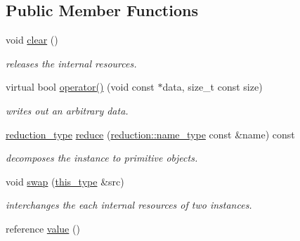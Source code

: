 \subsection*{Public Member Functions}
\begin{DoxyCompactItemize}
\item 
\hypertarget{classhryky_1_1_adapter_adbdbd187b837f6782b776ca8aabd411b}{void \hyperlink{classhryky_1_1_adapter_adbdbd187b837f6782b776ca8aabd411b}{clear} ()}\label{classhryky_1_1_adapter_adbdbd187b837f6782b776ca8aabd411b}

\begin{DoxyCompactList}\small\item\em releases the internal resources. \end{DoxyCompactList}\item 
\hypertarget{classhryky_1_1writer_1_1_adapter_a6078dbc44e91c1ec4f4e6ddc62aac4be}{virtual bool \hyperlink{classhryky_1_1writer_1_1_adapter_a6078dbc44e91c1ec4f4e6ddc62aac4be}{operator()} (void const $\ast$data, size\-\_\-t const size)}\label{classhryky_1_1writer_1_1_adapter_a6078dbc44e91c1ec4f4e6ddc62aac4be}

\begin{DoxyCompactList}\small\item\em writes out an arbitrary data. \end{DoxyCompactList}\item 
\hypertarget{classhryky_1_1_adapter_a42532b43ac680d162bbc1a2e3ebc6b99}{\hyperlink{namespacehryky_a343a9a4c36a586be5c2693156200eadc}{reduction\-\_\-type} \hyperlink{classhryky_1_1_adapter_a42532b43ac680d162bbc1a2e3ebc6b99}{reduce} (\hyperlink{namespacehryky_1_1reduction_ac686c30a4c8d196bbd0f05629a6b921f}{reduction\-::name\-\_\-type} const \&name) const}\label{classhryky_1_1_adapter_a42532b43ac680d162bbc1a2e3ebc6b99}

\begin{DoxyCompactList}\small\item\em decomposes the instance to primitive objects. \end{DoxyCompactList}\item 
\hypertarget{classhryky_1_1_adapter_ae95517793bc16f6ba623bc994bc17c43}{void \hyperlink{classhryky_1_1_adapter_ae95517793bc16f6ba623bc994bc17c43}{swap} (\hyperlink{classhryky_1_1writer_1_1_adapter_a9fe895f62ad5d6fa98ea5264772b6a26}{this\-\_\-type} \&src)}\label{classhryky_1_1_adapter_ae95517793bc16f6ba623bc994bc17c43}

\begin{DoxyCompactList}\small\item\em interchanges the each internal resources of two instances. \end{DoxyCompactList}\item 
\hypertarget{classhryky_1_1_adapter_ab736ecd30f215ca3cbd2364f818cb83f}{reference \hyperlink{classhryky_1_1_adapter_ab736ecd30f215ca3cbd2364f818cb83f}{value} ()}\label{classhryky_1_1_adapter_ab736ecd30f215ca3cbd2364f818cb83f}


\end{DoxyCompactItemize}
